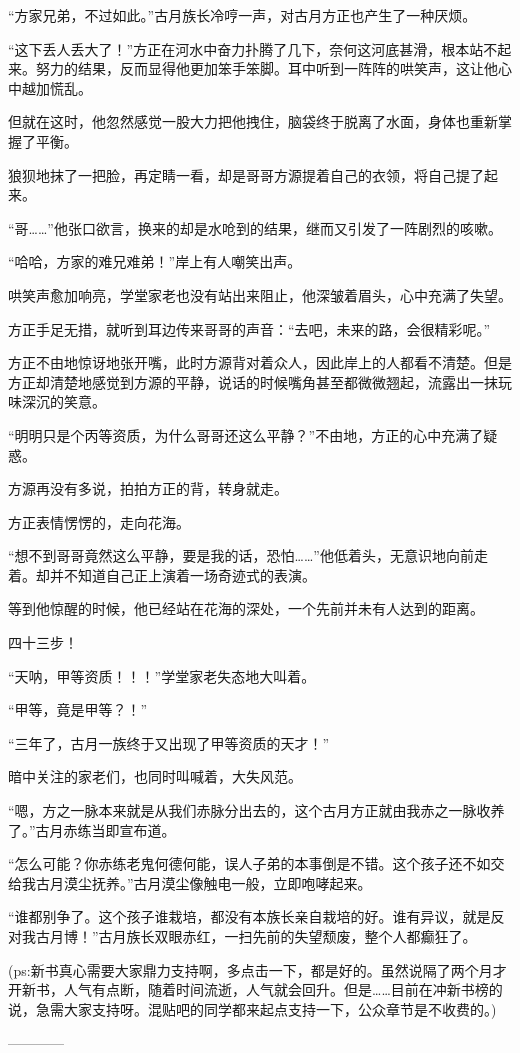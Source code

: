 \begin{this_body}
“方家兄弟，不过如此。”古月族长冷哼一声，对古月方正也产生了一种厌烦。

“这下丢人丢大了！”方正在河水中奋力扑腾了几下，奈何这河底甚滑，根本站不起来。努力的结果，反而显得他更加笨手笨脚。耳中听到一阵阵的哄笑声，这让他心中越加慌乱。

但就在这时，他忽然感觉一股大力把他拽住，脑袋终于脱离了水面，身体也重新掌握了平衡。

狼狈地抹了一把脸，再定睛一看，却是哥哥方源提着自己的衣领，将自己提了起来。

“哥……”他张口欲言，换来的却是水呛到的结果，继而又引发了一阵剧烈的咳嗽。

“哈哈，方家的难兄难弟！”岸上有人嘲笑出声。

哄笑声愈加响亮，学堂家老也没有站出来阻止，他深皱着眉头，心中充满了失望。

方正手足无措，就听到耳边传来哥哥的声音：“去吧，未来的路，会很精彩呢。”

方正不由地惊讶地张开嘴，此时方源背对着众人，因此岸上的人都看不清楚。但是方正却清楚地感觉到方源的平静，说话的时候嘴角甚至都微微翘起，流露出一抹玩味深沉的笑意。

“明明只是个丙等资质，为什么哥哥还这么平静？”不由地，方正的心中充满了疑惑。

方源再没有多说，拍拍方正的背，转身就走。

方正表情愣愣的，走向花海。

“想不到哥哥竟然这么平静，要是我的话，恐怕……”他低着头，无意识地向前走着。却并不知道自己正上演着一场奇迹式的表演。

等到他惊醒的时候，他已经站在花海的深处，一个先前并未有人达到的距离。

四十三步！

“天呐，甲等资质！！！”学堂家老失态地大叫着。

“甲等，竟是甲等？！”

“三年了，古月一族终于又出现了甲等资质的天才！”

暗中关注的家老们，也同时叫喊着，大失风范。

“嗯，方之一脉本来就是从我们赤脉分出去的，这个古月方正就由我赤之一脉收养了。”古月赤练当即宣布道。

“怎么可能？你赤练老鬼何德何能，误人子弟的本事倒是不错。这个孩子还不如交给我古月漠尘抚养。”古月漠尘像触电一般，立即咆哮起来。

“谁都别争了。这个孩子谁栽培，都没有本族长亲自栽培的好。谁有异议，就是反对我古月博！”古月族长双眼赤红，一扫先前的失望颓废，整个人都癫狂了。

(ps:新书真心需要大家鼎力支持啊，多点击一下，都是好的。虽然说隔了两个月才开新书，人气有点断，随着时间流逝，人气就会回升。但是……目前在冲新书榜的说，急需大家支持呀。混贴吧的同学都来起点支持一下，公众章节是不收费的。)

------------

\end{this_body}

